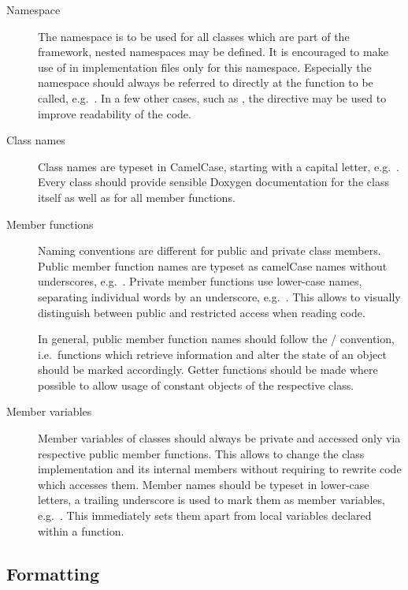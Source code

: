 \begin{description}
    \item[Namespace] The  namespace is to be used for all classes which are part of the framework, nested namespaces may be defined. It is encouraged to make use of  in implementation files only for this namespace. Especially the namespace  should always be referred to directly at the function to be called, e.g.\ . In a few other cases, such as , the  directive may be used to improve readability of the code.

    \item[Class names] Class names are typeset in CamelCase, starting with a capital letter, e.g.\ . Every class should provide sensible Doxygen documentation for the class itself as well as for all member functions.

    \item[Member functions] Naming conventions are different for public and private class members. Public member function names are typeset as camelCase names without underscores, e.g.\ . Private member functions use lower-case names, separating individual words by an underscore, e.g.\ . This allows to visually distinguish between public and restricted access when reading code.

    In general, public member function names should follow the / convention, i.e.\ functions which retrieve information and alter the state of an object should be marked accordingly. Getter functions should be made  where possible to allow usage of constant objects of the respective class.

    \item[Member variables] Member variables of classes should always be private and accessed only via respective public member functions. This allows to change the class implementation and its internal members without requiring to rewrite code which accesses them. Member names should be typeset in lower-case letters, a trailing underscore is used to mark them as member variables, e.g.\ . This immediately sets them apart from local variables declared within a function.
\end{description}

\subsection{Formatting}


